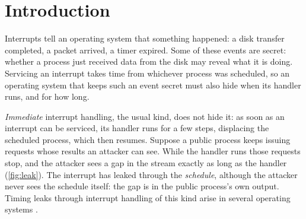 \section{Introduction}\label{sec:intro}

Interrupts tell an operating system that something happened: a disk transfer
completed, a packet arrived, a timer expired. Some of these events are secret:
whether a process just received data from the disk may reveal what it is doing.
Servicing an interrupt takes time from whichever process was scheduled, so an
operating system that keeps such an event secret must also hide when its handler
runs, and for how long.

\emph{Immediate} interrupt handling, the usual kind, does not hide it: as soon as an
interrupt can be serviced, its handler runs for a few steps, displacing the scheduled
process, which then resumes. Suppose a public process keeps issuing requests whose results an
attacker can see. While the handler runs those requests stop, and the attacker sees
a gap in the stream exactly as long as the handler (\cref{fig:leak}). The interrupt
has leaked through the \emph{schedule}, although the attacker never sees the
schedule itself: the gap is in the public process's own output. Timing leaks
through interrupt handling of this kind arise in several operating
systems .

